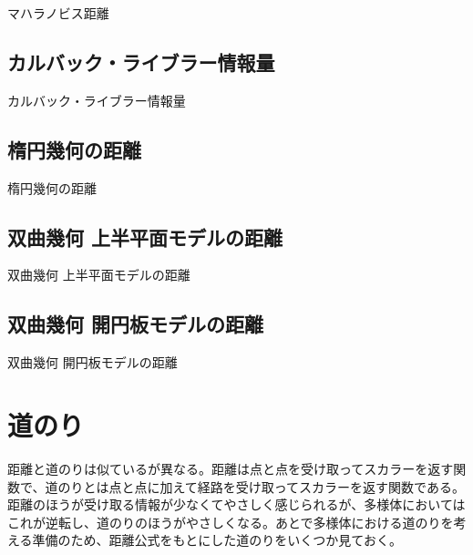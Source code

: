 マハラノビス距離

\newpage


\subsection{ カルバック・ライブラー情報量 }

カルバック・ライブラー情報量

\newpage


\subsection{ 楕円幾何の距離 }

楕円幾何の距離

\newpage


\subsection{ 双曲幾何 上半平面モデルの距離 }

双曲幾何 上半平面モデルの距離

\newpage


\subsection{ 双曲幾何 開円板モデルの距離 }

双曲幾何 開円板モデルの距離

\newpage


\section{ 道のり }

距離と道のりは似ているが異なる。距離は点と点を受け取ってスカラーを返す関数で、道のりとは点と点に加えて経路を受け取ってスカラーを返す関数である。距離のほうが受け取る情報が少なくてやさしく感じられるが、多様体においてはこれが逆転し、道のりのほうがやさしくなる。あとで多様体における道のりを考える準備のため、距離公式をもとにした道のりをいくつか見ておく。

